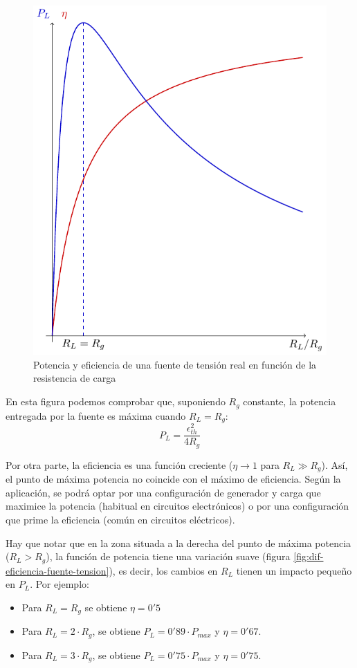 \begin{figure}
  \centering
  \includegraphics[height=0.3\textheight]{../figs/FuenteReal_PotenciaRendimiento.pdf}
  \caption{Potencia y eficiencia de una fuente de tensión real en
    función de la resistencia de carga}
  \label{fig:eficiencia-fuente}
\end{figure}

En esta figura podemos comprobar que, suponiendo \(R_g\) constante, la
potencia entregada por la fuente es máxima cuando \(R_L = R_g\):
\begin{equation*}
  P_L = \frac{\epsilon^2_{th}}{4 R_g}
\end{equation*}

Por otra parte, la eficiencia es una función creciente (\(\eta \to 1\)
para \(R_L \gg R_g\)). Así, el punto de máxima potencia no coincide
con el máximo de eficiencia. Según la aplicación, se podrá optar por
una configuración de generador y carga que maximice la potencia
(habitual en circuitos electrónicos) o por una configuración que prime
la eficiencia (común en circuitos eléctricos).

Hay que notar que en la zona situada a la derecha del punto de máxima
potencia (\(R_L > R_g\)), la función de potencia tiene una variación
suave (figura \ref{fig:dif-eficiencia-fuente-tension}), es decir, los
cambios en \(R_L\) tienen un impacto pequeño en \(P_L\).  Por ejemplo:
\begin{itemize}
\item Para \(R_L = R_g\) se obtiene \(\eta = 0'5\)
\item Para \(R_L = 2\cdot R_g\), se obtiene
  \(P_L = 0'89 \cdot P_{max}\) y \(\eta = 0'67\).
\item Para \(R_L = 3\cdot R_g\), se obtiene
  \(P_L = 0'75 \cdot P_{max}\) y \(\eta = 0'75\).
\end{itemize}

